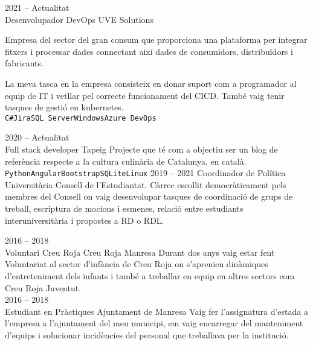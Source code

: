 \documentclass[9pt]{developercv} %
\begin{document}
\begin{entrylist}
	\entry
		{2021 -- Actualitat\\}
		{Desenvolupador DevOps}
		{UVE Solutions}
		{Empresa del sector del gran consum que proporciona una plataforma per integrar fitxers i processar dades connectant així dades de consumidors, distribuïdors i fabricants.

		La meva tasca en la empresa consisteix en donar suport com a programador al equip de IT i vetllar pel correcte funcionament del CICD. També vaig tenir tasques de gestió en kubernetes.
		\\ \texttt{C#}\slashsep\texttt{Jira}\slashsep\texttt{SQL Server}\slashsep\texttt{Windows}\slashsep\texttt{Azure DevOps}}
    \entry
		{2020 -- Actualitat\\}
		{Full stack developer}
		{Tapeig}
		{Projecte que té com a objectiu ser un blog de referència respecte a la cultura culinària de
        Catalunya, en català.\\ \texttt{Python}\slashsep\texttt{Angular}\slashsep\texttt{Bootstrap}\slashsep\texttt{SQLite}\slashsep\texttt{Linux}}
	\entry
		{2019 -- 2021}
		{Coordinador de Política Universitària}
		{Consell de l'Estudiantat.}
		{ Càrrec escollit democràticament pels membres del Consell on vaig desenvolupar tasques de
        coordinació de grups de treball, escriptura de mocions i esmenes, relació entre estudiants
        interuniversitària i propostes a RD o RDL.
		\\ }
	
	\entry
		{2016 -- 2018\\}
		{Voluntari Creu Roja}
		{Creu Roja Manresa}
		{Durant dos anys vaig estar fent Voluntariat al sector d’infància de Creu Roja on s’aprenien
        dinàmiques d’entreteniment dels infants i també a treballar en equip en altres sectors com Creu
        Roja Juventut. \\ }
	\entry
		{2016 -- 2018\\}
		{Estudiant en Pràctiques}
		{Ajuntament de Manresa}
		{ Vaig fer l'assignatura d'estada a l'empresa a l'ajuntament del meu municipi, em vaig encarregar del manteniment d'equips i solucionar incidències del personal que treballava per la institució. }
\end{entrylist}


\end{document}
